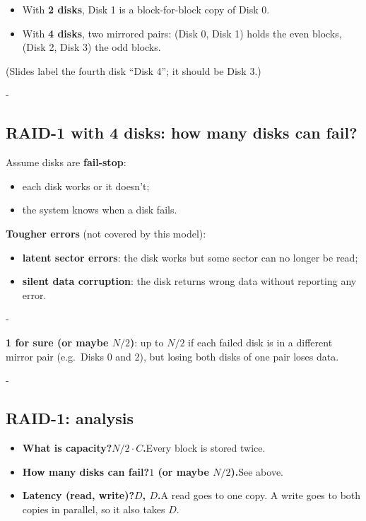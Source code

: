 \documentclass[11pt,a4paper]{article}
\makeatletter
\newcommand{\keepspace}[1]{\par\penalty-100\begingroup
  \setlength{\dimen@}{#1}\dimen@ii\pagegoal\advance\dimen@ii-\pagetotal
  \ifdim\dimen@>\dimen@ii\ifdim\dimen@ii>\z@\vfil\fi\break\fi\endgroup}
\makeatother
\begin{document}
\begin{itemize}
  \item With \textbf{2 disks}, Disk 1 is a block-for-block copy of Disk 0.
  \item With \textbf{4 disks}, two mirrored pairs: (Disk 0, Disk 1) holds the
        even blocks, (Disk 2, Disk 3) the odd blocks.
\end{itemize}
{\small (Slides label the fourth disk ``Disk 4''; it should be Disk 3.)}

\keepspace{9\baselineskip}
\subsection{RAID-1 with 4 disks: how many disks can fail?}

\begin{defbox}
Assume disks are \textbf{fail-stop}:
\begin{itemize}
  \item each disk works or it doesn't;
  \item the system knows when a disk fails.
\end{itemize}
\textbf{Tougher errors} (not covered by this model):
\begin{itemize}
  \item \textbf{latent sector errors}: the disk works but some sector can no
        longer be read;
  \item \textbf{silent data corruption}: the disk returns wrong data without
        reporting any error.
\end{itemize}
\end{defbox}

\keepspace{9\baselineskip}
\begin{quizbox}
\textbf{1 for sure (or maybe \(N/2\))}: up to \(N/2\) if each failed disk is
in a different mirror pair (e.g.\ Disks 0 and 2), but losing both disks of
one pair loses data.
\end{quizbox}

\keepspace{9\baselineskip}
\subsection{RAID-1: analysis}

\begin{quizbox}
\begin{itemize}
  \item \textbf{What is capacity?}\quad \textbf{\(N/2 \cdot C\).}\enspace Every block is stored twice.
  \item \textbf{How many disks can fail?}\quad \textbf{\(1\) (or maybe \(N/2\)).}\enspace See above.
  \item \textbf{Latency (read, write)?}\quad \textbf{\(D\), \(D\).}\enspace A read goes to one copy. A write goes to both copies in parallel, so it also takes \(D\).
\end{itemize}
\end{quizbox}
\end{document}
